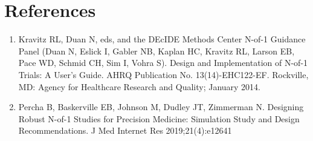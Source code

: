 \documentclass[11pt,]{article}
\providecommand{\tightlist}{%
  \setlength{\itemsep}{0pt}\setlength{\parskip}{0pt}}
\begin{document}
\pagebreak

\section{References}\label{references}

\begin{enumerate}
\def\labelenumi{\arabic{enumi}.}
\tightlist
\item
  Kravitz RL, Duan N, eds, and the DEcIDE Methods Center N-of-1 Guidance
  Panel (Duan N, Eslick I, Gabler NB, Kaplan HC, Kravitz RL, Larson EB,
  Pace WD, Schmid CH, Sim I, Vohra S). Design and Implementation of
  N-of-1 Trials: A User's Guide. AHRQ Publication No. 13(14)-EHC122-EF.
  Rockville, MD: Agency for Healthcare Research and Quality; January
  2014.
\item
  Percha B, Baskerville EB, Johnson M, Dudley JT, Zimmerman N. Designing
  Robust N-of-1 Studies for Precision Medicine: Simulation Study and
  Design Recommendations. J Med Internet Res 2019;21(4):e12641
\end{enumerate}

\pagebreak
\end{document}
